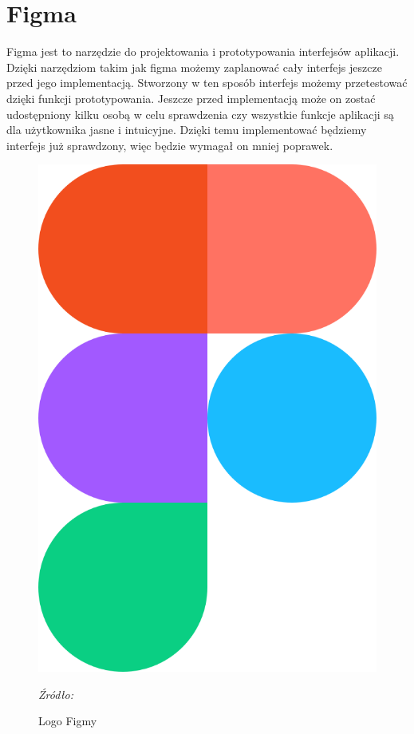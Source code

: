\documentclass[12pt,oneside]{report}
\begin{document}
\section{Figma}
Figma jest to narzędzie do projektowania i prototypowania interfejsów aplikacji. Dzięki narzędziom takim jak figma możemy zaplanować cały interfejs jeszcze przed jego implementacją.  Stworzony w ten sposób interfejs możemy przetestować dzięki funkcji prototypowania. Jeszcze przed implementacją może on zostać udostępniony kilku osobą w celu sprawdzenia czy wszystkie funkcje aplikacji są dla użytkownika jasne i intuicyjne. Dzięki temu implementować będziemy interfejs już sprawdzony, więc będzie wymagał on mniej poprawek.
\begin{figure}[H]
	\centering
	\includegraphics[scale=0.10]{FigmaLogo}
	\caption{Logo Figmy}
	\textit{Źródło: \cite{FigmaIcon}}
	\label{FigmaLogo}
\end{figure}
\end{document}
